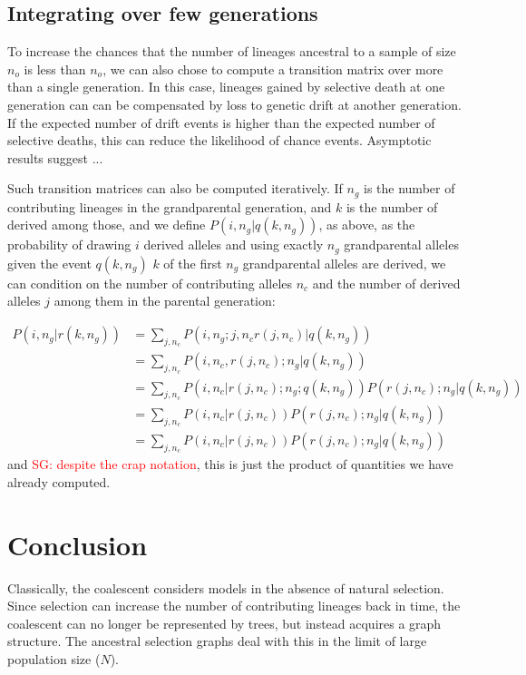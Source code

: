 \documentclass[review]{elsarticle}
\newcommand{\sgcomment}[1]{\textcolor{red}{SG: #1}}
\begin{document}
\subsection{Integrating over few generations} 
To increase the chances that the number of lineages ancestral to a sample 
of size $n_o$ is less than $n_o$, we can also chose to compute a transition matrix over more 
than a single generation. In this case, lineages gained by selective death at one generation can 
can be compensated by loss to genetic drift at another generation. If the expected number of 
drift events is higher than the expected number of selective deaths, this can reduce the likelihood 
of chance events. Asymptotic results suggest ... 

Such transition matrices can also be computed iteratively. If  $n_g$ is the number of contributing 
lineages in the grandparental generation, and $k$ is the number of derived among those, and we define 
 $P(i, n_g | q(k, n_g))$, as above, as the probability of drawing $i$ derived alleles and using exactly $n_g$
 grandparental alleles given the event $q(k, n_g)$ $k$ of the first $n_g$ grandparental alleles are derived, we can 
 condition on the number of contributing alleles $n_c$ and the number of derived alleles $j$ among them in the parental generation:
 
 \begin{equation}
 \begin{split}
 P(i, n_g | r(k, n_g)) & = \sum_{j,n_c} P(i, n_g ; j, n_c r(j,n_c)  | q(k, n_g))\\
 &= \sum_{j,n_c} P(i, n_c,  r(j,n_c); n_g  | q(k, n_g))\\
 &= \sum_{j,n_c} P(i, n_c|   r(j,n_c); n_g  ; q(k, n_g))  P(r(j,n_c); n_g  | q(k, n_g))\\
 &= \sum_{j,n_c} P(i, n_c |   r(j,n_c))  P( r(j,n_c); n_g  | q(k, n_g))\\
 &= \sum_{j,n_c} P(i, n_c |   r(j,n_c))  P( r(j,n_c); n_g  | q(k, n_g))
 \end{split}
\end{equation}
and \sgcomment{despite the crap notation}, this is just the product of quantities we have already computed.


\section{Conclusion}
\label{sec:conclusion}

Classically, the coalescent considers models in the absence of natural selection. Since selection
can increase the number of contributing lineages back in time, the coalescent can no longer be
represented by trees, but instead acquires a graph structure. The ancestral selection graphs
\citep{KroneNeuhauser1997} deal with this in the limit of large population size ($N$).
\end{document}
